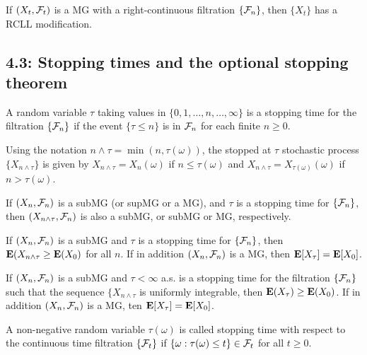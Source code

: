 \begin{theorem*} 
If $(X_t, \mathcal{F}_t)$ is a MG with a right-continuous filtration $\{\mathcal{F}_n\}$, then
$\{X_t\}$ has a RCLL modification.
\end{theorem*} 



\subsection*{4.3: Stopping times and the optional stopping theorem}
\begin{definition*} 
A random variable $\tau$ taking values in $\{0, 1, \dots, n, \dots, \infty\}$ is
a stopping time for the filtration $\{\mathcal{F}_n\}$ if the event $\{\tau \le n\}$ is
in $\mathcal{F}_n$ for each finite $n \ge 0$.
\end{definition*} 

\begin{definition*} 
Using the notation $n \land \tau = \min(n, \tau(\omega))$, the stopped at $\tau$
stochastic process $\{X_{n \land \tau}\}$ is given by
$X_{n\land \tau} = X_n (\omega)$ if $n \le \tau(\omega)$ and
$X_{n\land \tau} = X_{\tau(\omega)}(\omega)$ if $n > \tau(\omega)$.
\end{definition*} 

\begin{theorem*} 
If $(X_n, \mathcal{F}_n)$ is a subMG (or supMG or a MG), and $\tau$ is a stopping time
for $\{\mathcal{F}_n\}$, then $(X_{n \land \tau}, \mathcal{F}_n)$ is also a subMG, or subMG or MG,
respectively.
\end{theorem*} 

\begin{corollary*} 
If $(X_n, \mathcal{F}_n)$ is a subMG and $\tau$ is a stopping time for $\{\mathcal{F}_n\}$, then
$\mathbf{E}(X_{n \land \tau} \ge \mathbf{E}(X_0)$ for all $n$. If in addition $(X_n, \mathcal{F}_n)$ is a
MG, then $\mathbf{E}[X_\tau] = \mathbf{E}[X_0]$.
\end{corollary*} 

\begin{theorem*} If $(X_n, \mathcal{F}_n)$ is a subMG and $\tau
< \infty$ a.s. is a stopping time for the filtration $\{\mathcal{F}_n\}$ such that the
sequence $\{X_{n \land \tau}$ is uniformly integrable, then $\mathbf{E}(X_\tau) \ge
\mathbf{E}(X_0)$. If in addition $(X_n, \mathcal{F}_n)$ is a MG, ten $\mathbf{E}[X_\tau] = \mathbf{E}[X_0]$.
\end{theorem*} 

\begin{definition*} 
A non-negative random variable $\tau(\omega)$ is called stopping time with
respect to the continuous time filtration $\{\mathcal{F}_t\}$ if $\{\omega: \tau(\omega)
\le t\} \in \mathcal{F}_t$ for all $t \ge 0$.
\end{definition*} 

